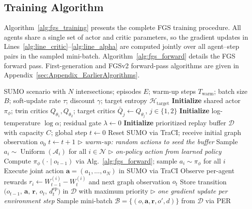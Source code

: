 \subsection{Training Algorithm}
\label{sec:Methodology_TrainingAlgorithm}

Algorithm~\ref{alg:fgs_training} presents the complete FGS training procedure. All agents share a single set of actor and critic parameters, so the gradient updates in Lines~\ref{alg:line_critic}--\ref{alg:line_alpha} are computed jointly over all agent--step pairs in the sampled mini-batch. Algorithm~\ref{alg:fgs_forward} details the FGS forward pass. First-generation and FGSv2 forward-pass algorithms are given in Appendix~\ref{sec:Appendix_EarlierAlgorithms}.

\begin{algorithm}[ht]
\caption{FGS Training}
\label{alg:fgs_training}
\begin{algorithmic}[1]
\Require SUMO scenario with $N$ intersections; episodes $E$; warm-up steps $T_{\text{warm}}$;
\Statex \quad batch size $B$; soft-update rate $\tau$; discount $\gamma$; target entropy $\mathcal{H}_{\text{target}}$
\State \textbf{Initialize} shared actor $\pi_\phi$; twin critics $Q_{\theta_1},Q_{\theta_2}$; target critics $\bar{Q}_j \leftarrow Q_{\theta_j}$, $j\in\{1,2\}$
\State \textbf{Initialize} log-temperature $\log\alpha$; residual gate $\lambda\leftarrow 0$
\State \textbf{Initialize} prioritized replay buffer $\mathcal{D}$ with capacity $C$; global step $t\leftarrow 0$
  \State Reset SUMO via TraCI; receive initial graph observation $o_0$
    \State $t \leftarrow t + 1$
     \hfill\(\triangleright\) \textit{warm-up: random actions to seed the buffer}
      \State Sample $a_i \sim \operatorname{Uniform}(\mathcal{A}_i)$ for all $i \in \mathcal{N}$
    \Else \hfill\(\triangleright\) \textit{on-policy action from learned policy}
      \State Compute $\pi_\phi(\cdot\mid o_{t-1})$ via Alg.~\ref{alg:fgs_forward}; sample $a_i \sim \pi_\phi$ for all $i$
    \EndIf
    \State Execute joint action $\mathbf{a} = (a_1,\ldots,a_N)$ in SUMO via TraCI
    \State Observe per-agent rewards $r_i \leftarrow W_{t-1}^{(i)} - W_t^{(i)}$ and next graph observation $o_t$
    \State Store transition $\bigl(o_{t-1},\,\mathbf{a},\,\mathbf{r},\,o_t,\,d^{\mathrm{ep}}_t\bigr)$ in $\mathcal{D}$ with maximum priority
     \hfill\(\triangleright\) \textit{one gradient update per environment step}
      \State Sample mini-batch $\mathcal{B} = \{(o,\mathbf{a},\mathbf{r},o',d)\}$ from $\mathcal{D}$ via PER

\end{algorithmic}
\end{algorithm}
